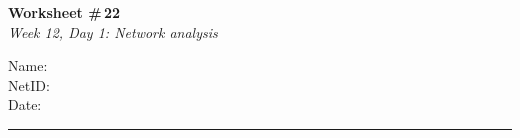 \documentclass[11pt]{article}
\begin{document}
\noindent
\begin{minipage}[t]{0.55\textwidth}
  \vspace{0pt}
  {\LARGE \textbf{Worksheet \#\,22}} \\[0.3em]
  {\large \textit{Week 12, Day 1: Network analysis}}
\end{minipage}
\hfill
\begin{minipage}[t]{0.40\textwidth}
  \vspace{0pt}
  \begin{mdframed}[linecolor=black, linewidth=1pt, innertopmargin=10pt, innerbottommargin=10pt]
    \small
    \vspace{0.4cm}
    Name: \underline{\hspace{4.5cm}} \\[1em]
    NetID: \underline{\hspace{4.3cm}} \\[1em]
    Date: \underline{\hspace{4.4cm}} \\
  \end{mdframed}
\end{minipage}

\vspace{1em}
\noindent\rule{\linewidth}{1pt}
\vspace{0.2em}
\end{document}
